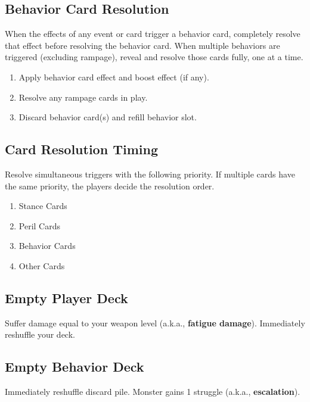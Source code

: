\documentclass[12pt]{article}
\newenvironment{enumerateCustom}
{\begin{enumerate}
  \setlength{\itemsep}{1pt}
  \setlength{\parskip}{0pt}
  \setlength{\parsep}{0pt}}
{\end{enumerate}}
\begin{document}
\pagebreak

\begin{multicols*}{2}

\subsection*{Behavior Card Resolution}
When the effects of any event or card trigger a behavior card, completely resolve that effect before resolving the behavior card. When multiple behaviors are triggered (excluding rampage), reveal and resolve those cards fully, one at a time.  
    \begin{enumerateCustom}
        \item Apply behavior card effect and boost effect (if any).
        \item Resolve any rampage cards in play.
        \item Discard behavior card(s) and refill behavior slot.
    \end{enumerateCustom}

\subsection*{Card Resolution Timing}
Resolve simultaneous triggers with the following priority. If multiple cards have the same priority, the players decide the resolution order.
    \begin{enumerateCustom}
        \item Stance Cards
        \item Peril Cards
        \item Behavior Cards
        \item Other Cards
    \end{enumerateCustom}

\subsection*{Empty Player Deck}
Suffer damage equal to your weapon level (a.k.a., \textbf{fatigue damage}). Immediately reshuffle your deck.

\subsection*{Empty Behavior Deck}
Immediately reshuffle discard pile. Monster gains 1 struggle (a.k.a., \textbf{escalation}).


\end{multicols*}
\end{document}
